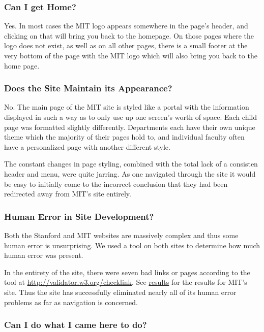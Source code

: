 \subsubsection*{Can I get Home?}

Yes. In most cases the MIT logo appears somewhere in the page's header, and clicking on that
will bring you back to the homepage. On those pages where the logo does not exist, as well as
on all other pages, there is a small footer at the very bottom of the page with the MIT logo
which will also bring you back to the home page.

\subsubsection*{Does the Site Maintain its Appearance?}

No. The main page of the MIT site is styled like a portal with the information displayed in such a way as to
only use up one screen's worth of space. Each child page was formatted slightly differently.
Departments each have their own unique theme which the majority of their pages hold to, and
individual faculty often have a personalized page with another different style.

The constant changes in page styling, combined with the total lack of a consisten header and
menu, were quite jarring. As one navigated through the site it would be easy to initially
come to the incorrect conclusion that they had been redirected away from MIT's site entirely.

\subsubsection*{Human Error in Site Development?}

Both the Stanford and MIT websites are massively complex and thus some human error is unsurprising.
We used a tool on both sites to determine how much human error was present.

In the entirety of the site, there were seven bad links or pages according to the tool at
\url{http://validator.w3.org/checklink}. See
\href{http://validator.w3.org/checklink?uri=mit.edu&hide_type=all&depth=&check=Check#results1}{results}
for the results for MIT's site. Thus the site has successfully eliminated nearly all of its
human error problems as far as navigation is concerned.

\subsubsection*{Can I do what I came here to do?}

